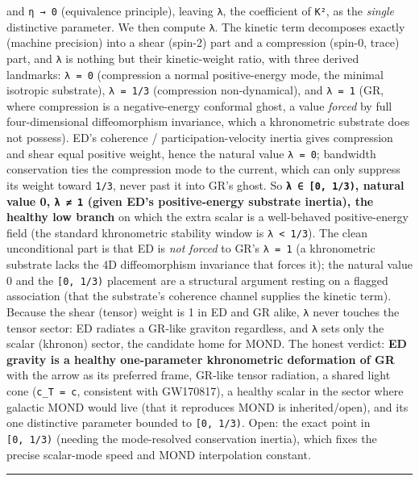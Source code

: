 \documentclass[
]{article}
\begin{document}
and \texttt{η\ →\ 0} (equivalence principle), leaving \texttt{λ}, the
coefficient of \texttt{K²}, as the \emph{single} distinctive parameter.
We then compute \texttt{λ}. The kinetic term decomposes exactly (machine
precision) into a shear (spin-2) part and a compression (spin-0, trace)
part, and \texttt{λ} is nothing but their kinetic-weight ratio, with
three derived landmarks: \texttt{λ\ =\ 0} (compression a normal
positive-energy mode, the minimal isotropic substrate),
\texttt{λ\ =\ 1/3} (compression non-dynamical), and \texttt{λ\ =\ 1}
(GR, where compression is a negative-energy conformal ghost, a value
\emph{forced} by full four-dimensional diffeomorphism invariance, which
a khronometric substrate does not possess). ED's coherence /
participation-velocity inertia gives compression and shear equal
positive weight, hence the natural value \texttt{λ\ =\ 0}; bandwidth
conservation ties the compression mode to the current, which can only
suppress its weight toward \texttt{1/3}, never past it into GR's ghost.
So \textbf{\texttt{λ\ ∈\ {[}0,\ 1/3)}, natural value 0, \texttt{λ\ ≠\ 1}
(given ED's positive-energy substrate inertia), the healthy low branch}
on which the extra scalar is a well-behaved positive-energy field (the
standard khronometric stability window is \texttt{λ\ \textless{}\ 1/3}).
The clean unconditional part is that ED is \emph{not forced} to GR's
\texttt{λ\ =\ 1} (a khronometric substrate lacks the 4D diffeomorphism
invariance that forces it); the natural value 0 and the
\texttt{{[}0,\ 1/3)} placement are a structural argument resting on a
flagged association (that the substrate's coherence channel supplies the
kinetic term). Because the shear (tensor) weight is 1 in ED and GR
alike, \texttt{λ} never touches the tensor sector: ED radiates a GR-like
graviton regardless, and \texttt{λ} sets only the scalar (khronon)
sector, the candidate home for MOND. The honest verdict: \textbf{ED
gravity is a healthy one-parameter khronometric deformation of GR} with
the arrow as its preferred frame, GR-like tensor radiation, a shared
light cone (\texttt{c\_T\ =\ c}, consistent with GW170817), a healthy
scalar in the sector where galactic MOND would live (that it reproduces
MOND is inherited/open), and its one distinctive parameter bounded to
\texttt{{[}0,\ 1/3)}. Open: the exact point in \texttt{{[}0,\ 1/3)}
(needing the mode-resolved conservation inertia), which fixes the
precise scalar-mode speed and MOND interpolation constant.

\begin{center}\rule{0.5\linewidth}{0.5pt}\end{center}
\end{document}
